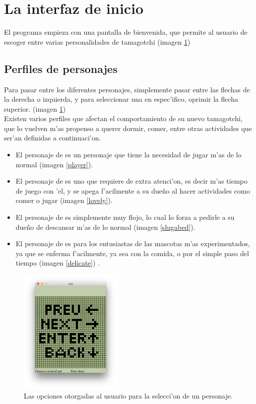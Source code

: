 \documentclass[12pt]{amsart}
\begin{document}
\section{La interfaz de inicio}
\hspace{10mm}El programa empieza con una pantalla de bienvenida, que permite al usuario de escoger entre varias personalidades de tamagotchi (imagen \ref{welcome})
\subsection{Perfiles de personajes}
Para pasar entre los diferentes personajes, simplemente pasar entre las flechas de la derecha o izquierda, y para seleccionar una en espec'ifico, oprimir la flecha superior. (imagen \ref{welcome})\\
Existen varios perfiles que afectan el comportamiento de su nuevo tamagotchi, que lo vuelven m'as propenso a querer dormir, comer, entre otras actividades que ser'an definidas a continuaci'on.

\begin{itemize}
\item El personaje de  es un personaje que tiene la necesidad de jugar m'as de lo normal (imagen \ref{player}).
\item El personaje de  es uno que requiere de extra atenci'on, es decir m'as tiempo de juego con 'el, y se apega f'acilmente a su due\~no al hacer actividades como comer o jugar (imagen \ref{lovely}).
\item El personaje de  es simplemente muy flojo, lo cual lo forza a pedirle a su due\~no de descansar m'as de lo normal (imagen \ref{slugabed}).
\item El personaje de  es para los entusiastas de las mascotas m'as experimentados, ya que se enferma f'acilmente, ya sea con la comida, o por el simple paso del tiempo (imagen \ref{delicate}) .
\end{itemize}

\begin{figure}
	\includegraphics[width=5.0cm]{images/Welcome.jpg}
	\caption{Las opciones otorgadas al usuario para la selecci'on de un personaje.}
	\label{welcome}
\end{figure} 
\end{document}
